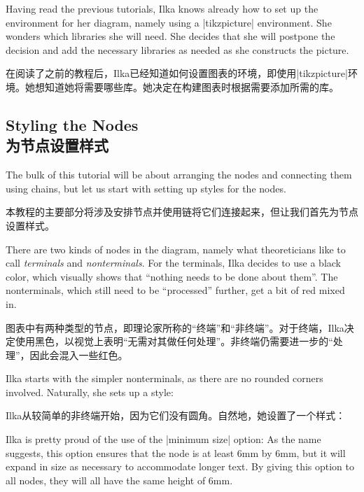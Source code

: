 Having read the previous tutorials, Ilka knows already how to set up the
environment for her diagram, namely using a |tikzpicture| environment. She
wonders which libraries she will need. She decides that she will postpone the
decision and add the necessary libraries as needed as she constructs the
picture.

在阅读了之前的教程后，Ilka已经知道如何设置图表的环境，即使用|tikzpicture|环境。她想知道她将需要哪些库。她决定在构建图表时根据需要添加所需的库。



\subsection{Styling the Nodes\\为节点设置样式}

The bulk of this tutorial will be about arranging the nodes and connecting them
using chains, but let us start with setting up styles for the nodes.

本教程的主要部分将涉及安排节点并使用链将它们连接起来，但让我们首先为节点设置样式。

There are two kinds of nodes in the diagram, namely what theoreticians like to
call \emph{terminals} and \emph{nonterminals}. For the terminals, Ilka decides
to use a black color, which visually shows that ``nothing needs to be done
about them''. The nonterminals, which still need to be ``processed'' further,
get a bit of red mixed in.

图表中有两种类型的节点，即理论家所称的“终端”和“非终端”。对于终端，Ilka决定使用黑色，以视觉上表明“无需对其做任何处理”。非终端仍需要进一步的“处理”，因此会混入一些红色。

Ilka starts with the simpler nonterminals, as there are no rounded corners
involved. Naturally, she sets up a style:

Ilka从较简单的非终端开始，因为它们没有圆角。自然地，她设置了一个样式：

%
\begin{codeexample}[preamble={\usetikzlibrary{positioning}}]
\end{codeexample}
%
Ilka is pretty proud of the use of the |minimum size| option: As the name
suggests, this option ensures that the node is at least 6mm by 6mm, but it will
expand in size as necessary to accommodate longer text. By giving this option
to all nodes, they will all have the same height of 6mm.

